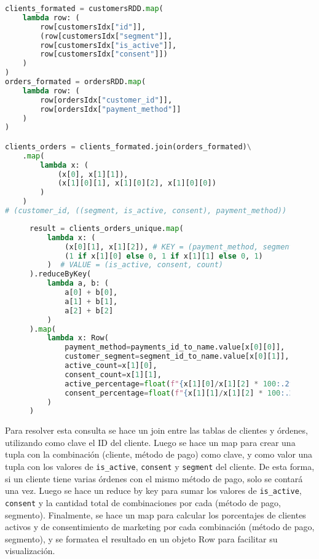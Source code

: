\begin{lstlisting}[language=Python, caption=Resolución de la consulta 3 propuesta por el enunciado, label={lst:enunciado_q3}, xleftmargin=30pt, xrightmargin=30pt]
clients_formated = customersRDD.map(
    lambda row: (
        row[customersIdx["id"]],
        (row[customersIdx["segment"]],
        row[customersIdx["is_active"]],
        row[customersIdx["consent"]])
    )
)
orders_formated = ordersRDD.map(
    lambda row: (
        row[ordersIdx["customer_id"]],
        row[ordersIdx["payment_method"]]
    )
)

clients_orders = clients_formated.join(orders_formated)\
    .map(
        lambda x: (
            (x[0], x[1][1]),
            (x[1][0][1], x[1][0][2], x[1][0][0])
        )
    )
# (customer_id, ((segment, is_active, consent), payment_method))
\end{lstlisting}

\begin{figure}[H]
\begin{lstlisting}[language=Python, caption=Resolución de la consulta 3 propuesta por el enunciado (continuación), label={lst:enunciado_q3_2}, xleftmargin=30pt, xrightmargin=30pt]
result = clients_orders_unique.map(
    lambda x: (
        (x[0][1], x[1][2]), # KEY = (payment_method, segment)
        (1 if x[1][0] else 0, 1 if x[1][1] else 0, 1)  
    )  # VALUE = (is_active, consent, count)
).reduceByKey(
    lambda a, b: (
        a[0] + b[0], 
        a[1] + b[1], 
        a[2] + b[2]
    )
).map(
    lambda x: Row(
        payment_method=payments_id_to_name.value[x[0][0]],
        customer_segment=segment_id_to_name.value[x[0][1]],
        active_count=x[1][0],
        consent_count=x[1][1],
        active_percentage=float(f"{x[1][0]/x[1][2] * 100:.2f}"),
        consent_percentage=float(f"{x[1][1]/x[1][2] * 100:.2f}"),
    )
)
\end{lstlisting}
\end{figure}

Para resolver esta consulta se hace un join entre las tablas de clientes y órdenes, utilizando como clave el ID del cliente. Luego se hace un map para crear una tupla con la combinación (cliente, método de pago) como clave, y como valor una tupla con los valores de \texttt{is\_active}, \texttt{consent} y \texttt{segment} del cliente. De esta forma, si un cliente tiene varias órdenes con el mismo método de pago, solo se contará una vez. Luego se hace un reduce by key para sumar los valores de \texttt{is\_active}, \texttt{consent} y la cantidad total de combinaciones por cada (método de pago, segmento). Finalmente, se hace un map para calcular los porcentajes de clientes activos y de consentimiento de marketing por cada combinación (método de pago, segmento), y se formatea el resultado en un objeto Row para facilitar su visualización.

